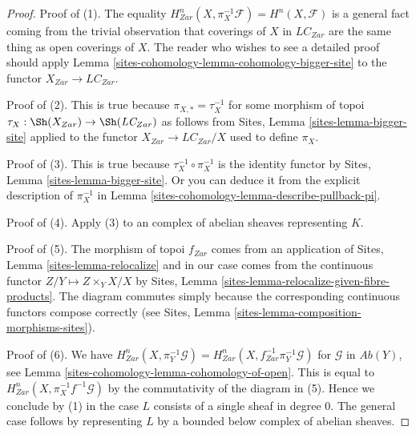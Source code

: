 \begin{proof}
Proof of (1).
The equality $H^n_{Zar}(X, \pi_X^{-1}\mathcal{F}) = H^n(X, \mathcal{F})$
is a general fact coming from the trivial observation that
coverings of $X$ in $\textit{LC}_{Zar}$ are the same thing as open
coverings of $X$. The reader who wishes to see a detailed proof
should apply Lemma \ref{sites-cohomology-lemma-cohomology-bigger-site} to the functor
$X_{Zar} \to \textit{LC}_{Zar}$.

\medskip\noindent
Proof of (2). This is true because $\pi_{X, *} = \tau_X^{-1}$
for some morphism of topoi $\tau_X : \Sh(X_{Zar}) \to \Sh(\textit{LC}_{Zar})$
as follows from Sites, Lemma \ref{sites-lemma-bigger-site}
applied to the functor
$X_{Zar} \to \textit{LC}_{Zar}/X$ used to define $\pi_X$.

\medskip\noindent
Proof of (3). This is true because $\tau_X^{-1} \circ \pi_X^{-1}$
is the identity functor by Sites, Lemma \ref{sites-lemma-bigger-site}.
Or you can deduce it from the explicit description of
$\pi_X^{-1}$ in Lemma \ref{sites-cohomology-lemma-describe-pullback-pi}.

\medskip\noindent
Proof of (4). Apply (3) to an complex of abelian sheaves representing $K$.

\medskip\noindent
Proof of (5). The morphism of topoi $f_{Zar}$ comes from an application of
Sites, Lemma \ref{sites-lemma-relocalize}
and in our case comes from the continuous functor
$Z/Y \mapsto Z \times_Y X/X$ by
Sites, Lemma \ref{sites-lemma-relocalize-given-fibre-products}.
The diagram commutes simply because the corresponding
continuous functors compose correctly
(see Sites, Lemma \ref{sites-lemma-composition-morphisms-sites}).

\medskip\noindent
Proof of (6). We have
$H^n_{Zar}(X, \pi_Y^{-1}\mathcal{G}) =
H^n_{Zar}(X, f_{Zar}^{-1}\pi_Y^{-1}\mathcal{G})$
for $\mathcal{G}$ in $\textit{Ab}(Y)$, see
Lemma \ref{sites-cohomology-lemma-cohomology-of-open}.
This is equal to $H^n_{Zar}(X, \pi_X^{-1}f^{-1}\mathcal{G})$
by the commutativity of the diagram in (5).
Hence we conclude by (1) in the case $L$ consists of a single
sheaf in degree $0$. The general case follows by representing
$L$ by a bounded below complex of abelian sheaves.


\end{proof}
